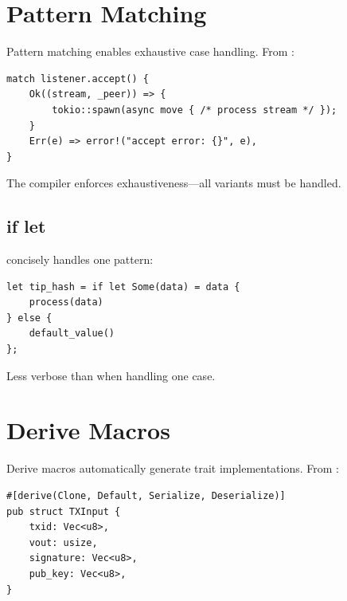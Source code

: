 \section{Pattern Matching}
\label{sec:ch24-pattern-matching}

Pattern matching enables exhaustive case handling. From :

\begin{listing}[htbp]
\caption{Match expression for error handling}
\label{lst:ch24-match}
\begin{verbatim}
match listener.accept() {
    Ok((stream, _peer)) => {
        tokio::spawn(async move { /* process stream */ });
    }
    Err(e) => error!("accept error: {}", e),
}
\end{verbatim}
\end{listing}

The compiler enforces exhaustiveness---all variants must be handled.

\subsection{if let}
\label{subsec:ch24-if-let}

 concisely handles one pattern:

\begin{verbatim}
let tip_hash = if let Some(data) = data {
    process(data)
} else {
    default_value()
};
\end{verbatim}

Less verbose than  when handling one case.

\section{Derive Macros}
\label{sec:ch24-derive-macros}

Derive macros automatically generate trait implementations. From :

\begin{listing}[htbp]
\caption{Derive macro for automatic implementations}
\label{lst:ch24-derive}
\begin{verbatim}
#[derive(Clone, Default, Serialize, Deserialize)]
pub struct TXInput {
    txid: Vec<u8>,
    vout: usize,
    signature: Vec<u8>,
    pub_key: Vec<u8>,
}
\end{verbatim}
\end{listing}

